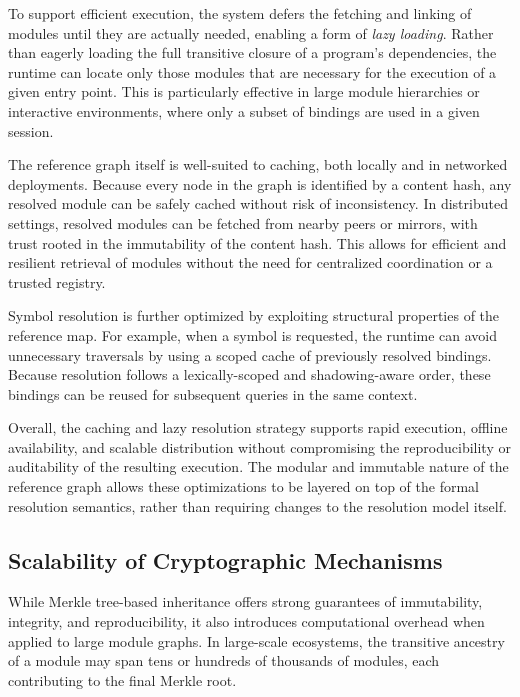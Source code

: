 \documentclass[sigplan,screen]{acmart}
\begin{document}
To support efficient execution, the system defers the fetching and linking of modules until they are actually needed, enabling a form of \textit{lazy loading}. Rather than eagerly loading the full transitive closure of a program's dependencies, the runtime can locate only those modules that are necessary for the execution of a given entry point. This is particularly effective in large module hierarchies or interactive environments, where only a subset of bindings are used in a given session.

The reference graph itself is well-suited to caching, both locally and in networked deployments. Because every node in the graph is identified by a content hash, any resolved module can be safely cached without risk of inconsistency. In distributed settings, resolved modules can be fetched from nearby peers or mirrors, with trust rooted in the immutability of the content hash. This allows for efficient and resilient retrieval of modules without the need for centralized coordination or a trusted registry.

Symbol resolution is further optimized by exploiting structural properties of the reference map. For example, when a symbol is requested, the runtime can avoid unnecessary traversals by using a scoped cache of previously resolved bindings. Because resolution follows a lexically-scoped and shadowing-aware order, these bindings can be reused for subsequent queries in the same context.

Overall, the caching and lazy resolution strategy supports rapid execution, offline availability, and scalable distribution without compromising the reproducibility or auditability of the resulting execution. The modular and immutable nature of the reference graph allows these optimizations to be layered on top of the formal resolution semantics, rather than requiring changes to the resolution model itself.

\subsection{Scalability of Cryptographic Mechanisms}
\label{sec:scalability-crypto}

While Merkle tree-based inheritance offers strong guarantees of immutability, integrity, and reproducibility, it also introduces computational overhead when applied to large module graphs. In large-scale ecosystems, the transitive ancestry of a module may span tens or hundreds of thousands of modules, each contributing to the final Merkle root.
\end{document}
